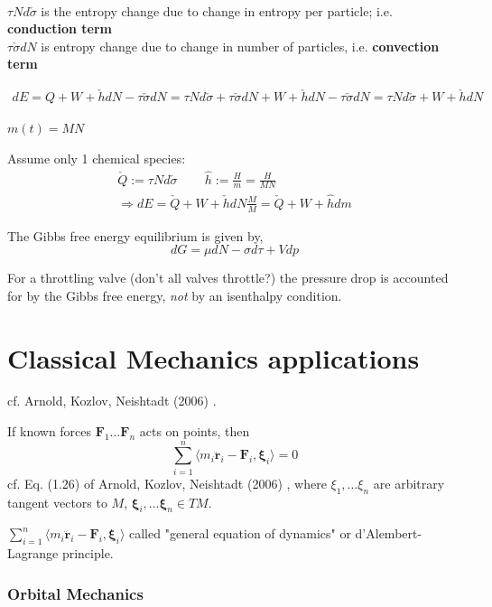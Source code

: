\documentclass[10pt]{amsart}
\begin{document}
\begin{multicols*}{2}
\quad \\ 
$\tau N d\check{\sigma}$ is the entropy change due to change in entropy per particle; i.e. \textbf{conduction term} \\
$\tau \check{\sigma} dN$ is entropy change due to change in number of particles, i.e. \textbf{convection term}

\[
\begin{gathered}
dE = Q + W + \check{h} dN - \tau \check{\sigma} dN = \tau N d\check{\sigma} + \tau \check{\sigma} dN + W + \check{h} dN - \tau \check{\sigma} dN = \tau N d\check{\sigma} + W + \check{h} dN
\end{gathered}
\]

$m(t) = MN$

Assume only 1 chemical species:
\[
\begin{gathered}
	\check{Q} := \tau N d\check{\sigma} \qquad \, \widehat{h} := \frac{H}{m} = \frac{H}{MN} \\ 
 \Longrightarrow dE = \check{Q} + W + \check{h} dN \frac{M}{M} = \check{Q} + W + \widehat{h} dm
\end{gathered}
\]

The Gibbs free energy equilibrium is given by, 
\[
dG = \mu dN - \sigma d\tau + V dp
\]

For a throttling valve (don't all valves throttle?) the pressure drop is accounted for by the Gibbs free energy, \emph{not} by an isenthalpy condition. 

\part{Classical Mechanics applications}

cf. Arnold, Kozlov, Neishtadt (2006) \cite{AKN2006}. 

If known forces $\mathbf{F}_1 \dots \mathbf{F}_n$ acts on points, then 
\begin{equation}
\sum_{i=1}^n \langle m_i \ddot{ \mathbf{r}}_i - \mathbf{F}_i , \mathbf{\xi}_i \rangle = 0
\end{equation}
cf. Eq. (1.26) of Arnold, Kozlov, Neishtadt (2006) \cite{AKN2006}, where $\xi_1 , \dots \xi_n$ are arbitrary tangent vectors to $M$, $\mathbf{\xi}_i, \dots \mathbf{\xi}_n \in TM$.  

$\sum_{i=1}^n \langle m_i \ddot{ \mathbf{r}}_i - \mathbf{F}_i , \mathbf{\xi}_i \rangle$ called "general equation of dynamics" or d'Alembert-Lagrange principle.  

\section{Orbital Mechanics}


\end{multicols*}
\end{document}

